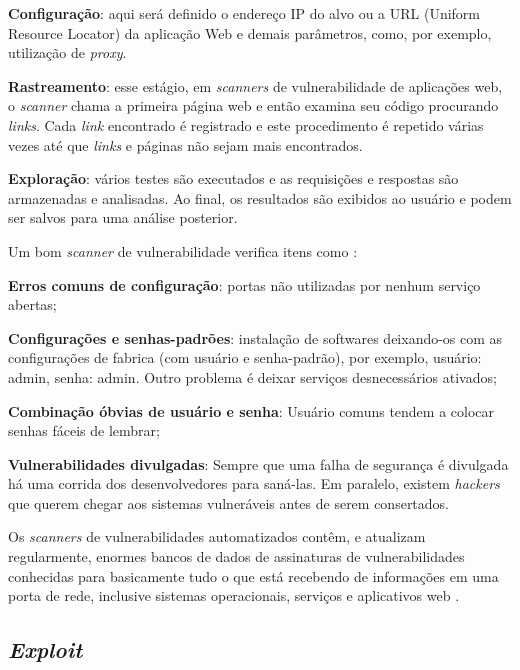 \begin{alineas}
 \item \textbf{Configuração}: aqui será definido o endereço IP do alvo ou a URL (Uniform Resource Locator) da aplicação Web e demais parâmetros, como, por exemplo, utilização de \textit{proxy}.
 \item \textbf{Rastreamento}: esse estágio, em \textit{scanners} de vulnerabilidade de aplicações web, o \textit{scanner} chama a primeira página web e então examina seu código procurando \textit{links}. Cada \textit{link} encontrado é registrado e este procedimento é repetido várias vezes até que \textit{links} e páginas não sejam mais encontrados.
 \item \textbf{Exploração}: vários testes são executados e as requisições e respostas são armazenadas e analisadas. Ao final, os resultados são exibidos ao usuário e podem ser salvos para uma análise posterior. 
\end{alineas}

Um bom \textit{scanner} de vulnerabilidade verifica itens como \cite{univhacker}: 

\begin{alineas}
\item \textbf{Erros comuns de configuração}: portas não utilizadas por nenhum serviço abertas;
\item \textbf{Configurações e senhas-padrões}: instalação de softwares deixando-os com as configurações de fabrica (com usuário e senha-padrão), por exemplo, usuário: admin, senha: admin. Outro problema é deixar serviços desnecessários ativados;
\item \textbf{Combinação óbvias de usuário e senha}: Usuário comuns tendem a colocar senhas fáceis de lembrar;
\item \textbf{Vulnerabilidades divulgadas}: Sempre que uma falha de segurança é divulgada há uma corrida dos desenvolvedores para saná-las. Em paralelo, existem \textit{hackers} que querem chegar aos sistemas vulneráveis antes de serem consertados.
\end{alineas}

Os \textit{scanners} de vulnerabilidades automatizados contêm, e atualizam regularmente, enormes bancos de dados de assinaturas de vulnerabilidades conhecidas para basicamente tudo o que está recebendo de informações em uma porta de rede, inclusive sistemas operacionais, serviços e aplicativos web \cite{hackers:stuart-joel}. 

\subsection{\textit{Exploit}} \label{sec:exploit}

